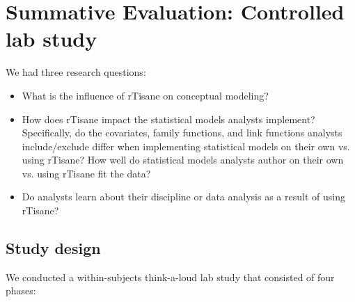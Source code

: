 \section{Summative Evaluation: Controlled lab study}

We had three research questions:

\begin{itemize}
    \item \evalConceptualModels What is the influence of rTisane on conceptual
    modeling?
    \item \evalStatisticalModels How does rTisane impact the statistical models
    analysts implement? Specifically, do the covariates, family functions, and
    link functions analysts include/exclude differ when implementing statistical
    models on their own vs. using rTisane? How well do statistical models
    analysts author on their own vs. using rTisane fit the data?  
    \item \evalLearning Do analysts learn about their discipline or data
    analysis as a result of using rTisane?
\end{itemize}

\subsection{Study design}
We conducted a within-subjects think-a-loud lab study that consisted of four phases: 

